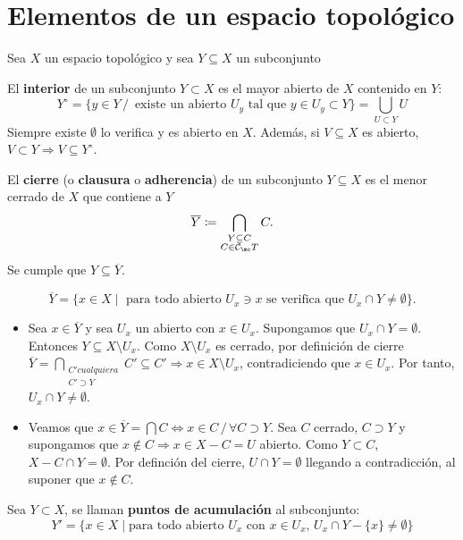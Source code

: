 \section{Elementos de un espacio topol\'ogico}
Sea $X$ un espacio topol\'ogico y sea $Y\subseteq X$ un subconjunto
\begin{defi} El \textbf{interior} de un subconjunto $Y\subset X$ es el mayor abierto de $X$ contenido en $Y$:
    $$Y^{\circ} = \{y\in Y \, / \, \text{ existe un abierto } U_y \text{ tal que } y\in U_y \subset Y\} = \bigcup_{U\subset Y} U$$
    Siempre existe $\emptyset$ lo verifica y es abierto en $X$. Adem\'as, si $V \subseteq X$ es abierto, $V\subset Y \Rightarrow V \subseteq Y^{\circ}$.
\end{defi}
\begin{defi}
El \textbf{cierre} (o \textbf{clausura} o \textbf{adherencia}) de un subconjunto $Y \subseteq X$ es el menor cerrado de $X$ que contiene a $Y$
\[
    \overline{Y} \coloneqq \bigcap_{\substack{Y \subseteq C \\ C \in \mathcal{C}_\mc T}} C.
\]
Se cumple que $Y \subseteq \overline{Y}$. 
\end{defi}
\begin{prop}
\[
    \overline{Y} = \{x \in X \mid \text{ para todo abierto } U_x \ni x \text{ se verifica que } U_x \cap Y \ne \emptyset\}.
\]
\end{prop}
\begin{dem}
\begin{itemize}
    \item[($\subseteq$)] Sea $x \in \overline{Y}$ y sea $U_x$ un abierto con $x \in U_x$. Supongamos que $U_x \cap Y = \emptyset$. Entonces $Y \subseteq X \setminus U_x$. Como $X \setminus U_x$ es cerrado, por definición de cierre $\displaystyle \overline{Y} = \bigcap_{\substack{C' cualquiera \\ C' \supset Y}} C ' \subseteq C' \Rightarrow x \in X \setminus U_x$, contradiciendo que $x \in U_x$. Por tanto, $U_x \cap Y \ne \emptyset$.
    \item[($\supseteq$)] Veamos que $x\in \overline Y = \bigcap C \iff x\in C \, / \, \forall C \supset Y$. Sea $C$ cerrado, $C\supset Y$ y supongamos que $x\nin C \Rightarrow x \in X-C = U$ abierto. Como $Y\subset C$, $X-C \cap Y=\emptyset$. Por definci\'on del cierre, $U\cap Y = \emptyset$ llegando a contradicci\'on, al suponer que $x\nin C$.
\end{itemize}
\end{dem}
\begin{defi}
    Sea $Y\subset X$, se llaman \textbf{puntos de acumulación} al subconjunto:
    $$Y' = \{x\in X \mid \text{para todo abierto } U_x \text{ con } x\in U_x, \, U_x \cap Y - \{x\} \neq \emptyset \}$$

\end{defi}
